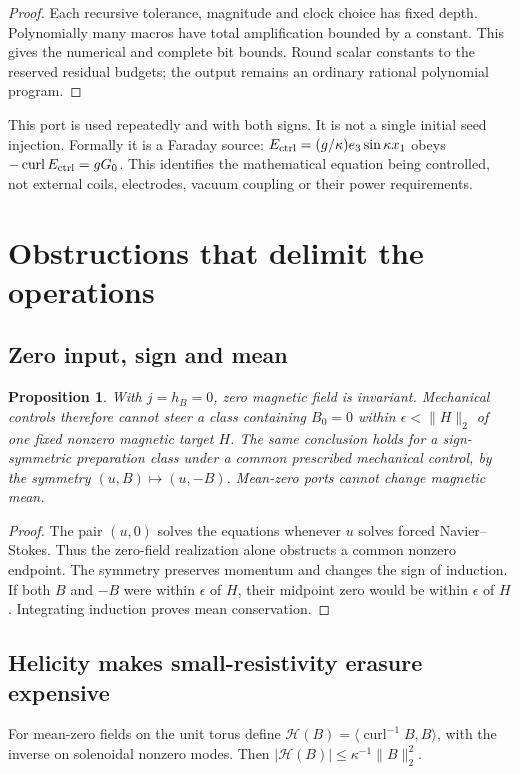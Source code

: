 \documentclass[11pt,a4paper]{amsart}
\newtheorem{proposition}[theorem]{Proposition}
\theoremstyle{definition}
\theoremstyle{remark}
\numberwithin{equation}{section}
\newcommand{\ip}[2]{\langle #1,#2\rangle}
\newcommand{\norm}[1]{\lVert #1\rVert}
\newcommand{\curl}{\operatorname{curl}}
\begin{document}
\begin{proof}
Each recursive tolerance, magnitude and clock choice has fixed depth. Polynomially many macros have total amplification bounded by a constant. This gives the numerical and complete bit bounds. Round scalar constants to the reserved residual budgets; the output remains an ordinary rational polynomial program.
\end{proof}

This port is used repeatedly and with both signs. It is not a single initial seed injection. Formally it is a Faraday source:
$E_{\rm ctrl}=(g/\kappa)e_3\sin\kappa x_1$ obeys
$-\curl E_{\rm ctrl}=gG_0$. This identifies the mathematical equation being controlled, not external coils, electrodes, vacuum coupling or their power requirements.



\section{Obstructions that delimit the operations}\label{sec:obstructions}

\subsection{Zero input, sign and mean}
\begin{proposition}\label{prop:zero}
With $j=h_B=0$, zero magnetic field is invariant. Mechanical controls therefore cannot steer a class containing $B_0=0$ within $\epsilon<\norm H_2$ of one fixed nonzero magnetic target $H$. The same conclusion holds for a sign-symmetric preparation class under a common prescribed mechanical control, by the symmetry $(u,B)\mapsto(u,-B)$. Mean-zero ports cannot change magnetic mean.
\end{proposition}
\begin{proof}
The pair $(u,0)$ solves the equations whenever $u$ solves forced Navier--Stokes. Thus the zero-field realization alone obstructs a common nonzero endpoint. The symmetry preserves momentum and changes the sign of induction. If both $B$ and $-B$ were within $\epsilon$ of $H$, their midpoint zero would be within $\epsilon$ of $H$. Integrating induction proves mean conservation.
\end{proof}

\subsection{Helicity makes small-resistivity erasure expensive}
For mean-zero fields on the unit torus define
$\mathscr H(B)=\ip{\curl^{-1}B}B$, with the inverse on solenoidal nonzero modes. Then
$|\mathscr H(B)|\le\kappa^{-1}\norm B_2^2$.
\end{document}
